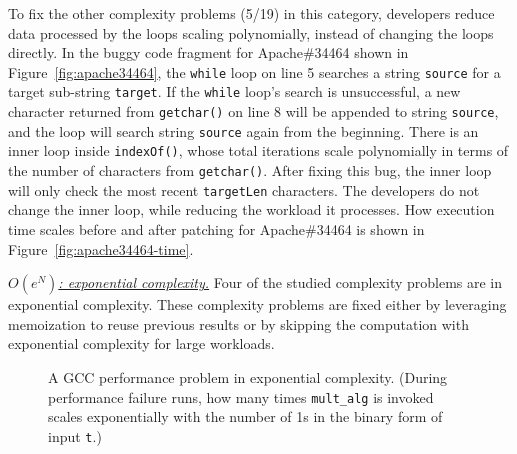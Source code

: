 To fix the other complexity problems (5/19) in this category,
developers reduce data processed by the loops scaling polynomially, 
instead of changing the loops directly.
In the buggy code fragment for Apache\#34464 shown in Figure~\ref{fig:apache34464},
the \texttt{while} loop on line 5 searches a string \texttt{source}
for a target sub-string \texttt{target}.
If the \texttt{while} loop's search is unsuccessful, 
a new character returned from \texttt{getchar()} on line 8 will be appended to string \texttt{source}, 
and the loop will search string \texttt{source} again from the beginning. 
There is an inner loop inside \texttt{indexOf()}, whose total iterations 
scale polynomially in terms of the number of characters from \texttt{getchar()}. 
After fixing this bug, the inner loop will only check the most recent \texttt{targetLen} characters.
The developers do not change the inner loop, 
while reducing the workload it processes.   
How execution time scales before and after patching for 
Apache\#34464 is shown in Figure~\ref{fig:apache34464-time}.




{\underline{\textit{$O(e^N)$: exponential complexity.}}}
Four of the studied complexity problems are in exponential complexity. 
These complexity problems are fixed 
either by leveraging memoization to reuse previous results 
or by skipping the computation with exponential complexity for large workloads. 



\begin{figure}
\centering
{}
  \mbox{}
  \vspace{-0.1in}
\caption{A GCC performance problem in exponential complexity. 
 \footnotesize{(During performance failure runs, how many times \texttt{mult\_alg} is invoked scales exponentially
  with the number of 1s in the binary form of input \texttt{t}.)}}
\vspace{-0.1in}
\label{fig:gcc27733}
\vspace{-0.15in}
\end{figure}


